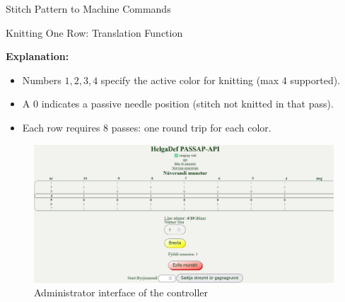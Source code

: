 \documentclass[
    NAME={Dr. Helga Ingimundardóttir},
    EMAIL={helgaingim@hi.is},
    FACULTY={Industrial Engineering},
    TITLE={HiDef Textiles: Reviving Tradition with Innovation},
    SUBTITLE={Empowering Creativity and Sustainability in Textile Production through Digital Transformation},
    SEMINAR={Reykjavík DataBeers},
    DATE={January 25, 2025},
    WIDE={true}
]{HI-LaTeX/hi-beamer}
\begin{document}
    \begin{frame}[allowframebreaks]{Stitch Pattern to Machine Commands}
        \begin{exampleblock}{Knitting One Row: Translation Function}
            \centering
        \end{exampleblock}
        \vspace{1em}
        \textbf{Explanation:}
        \begin{itemize}
            \item Numbers \(1, 2, 3, 4\) specify the active color for knitting (max 4 supported).
            \item A \(0\) indicates a passive needle position (stitch not knitted in that pass).
            \item Each row requires 8 passes: one round trip for each color.
        \end{itemize}
        \framebreak
        \begin{figure}
            \centering
            \includegraphics[width=.9\linewidth]{include/passapiscreen.png}
            \caption{Administrator interface of the controller}
        \end{figure}
    \end{frame}
\end{document}
